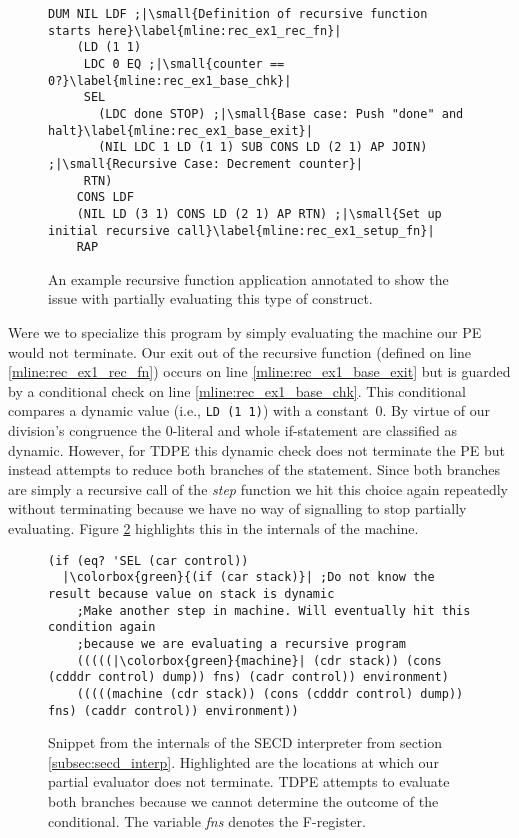 \documentclass[a4paper,12pt,twoside,openright]{report}
\theoremstyle{definition}
\begin{document}
\begin{figure}[ht]
\begin{verbatim}
DUM NIL LDF ;|\small{Definition of recursive function starts here}\label{mline:rec_ex1_rec_fn}|
    (LD (1 1)
     LDC 0 EQ ;|\small{counter == 0?}\label{mline:rec_ex1_base_chk}|
     SEL
       (LDC done STOP) ;|\small{Base case: Push "done" and halt}\label{mline:rec_ex1_base_exit}|
       (NIL LDC 1 LD (1 1) SUB CONS LD (2 1) AP JOIN) ;|\small{Recursive Case: Decrement counter}|
     RTN)
    CONS LDF
    (NIL LD (3 1) CONS LD (2 1) AP RTN) ;|\small{Set up initial recursive call}\label{mline:rec_ex1_setup_fn}|
    RAP
\end{verbatim}
\caption{An example recursive function application annotated to show the issue with partially evaluating this type of construct.}
\label{lst:secd_recursion_ex1}
\end{figure}

Were we to specialize this program by simply evaluating the machine our PE would not terminate. Our exit out of the recursive function (defined on line \ref{mline:rec_ex1_rec_fn}) occurs on line \ref{mline:rec_ex1_base_exit} but is guarded by a conditional check on line \ref{mline:rec_ex1_base_chk}. This conditional compares a dynamic value (i.e., \mbox{\texttt{LD (1 1)}}) with a \mbox{constant 0}. By virtue of our division's congruence the \mbox{0-literal} and whole if-statement are classified as dynamic. However, for TDPE this dynamic check does not terminate the PE but instead attempts to reduce both branches of the statement. Since both branches are simply a recursive call of the \textit{step} function we hit this choice again repeatedly without terminating because we have no way of signalling to stop partially evaluating. Figure \ref{lst:secd_recursion_machine_ex1} highlights this in the internals of the machine.

\begin{figure}[ht!]
\begin{verbatim}
(if (eq? 'SEL (car control))
  |\colorbox{green}{(if (car stack)}| ;Do not know the result because value on stack is dynamic
    ;Make another step in machine. Will eventually hit this condition again
    ;because we are evaluating a recursive program
    (((((|\colorbox{green}{machine}| (cdr stack)) (cons (cdddr control) dump)) fns) (cadr control)) environment)
    (((((machine (cdr stack)) (cons (cdddr control) dump)) fns) (caddr control)) environment))
\end{verbatim}
\caption{Snippet from the internals of the SECD interpreter from section \ref{subsec:secd_interp}. Highlighted are the locations at which our partial evaluator does not terminate. TDPE attempts to evaluate both branches because we cannot determine the outcome of the conditional. The variable \textit{fns} denotes the F-register.}
\label{lst:secd_recursion_machine_ex1}
\end{figure}
\end{document}
